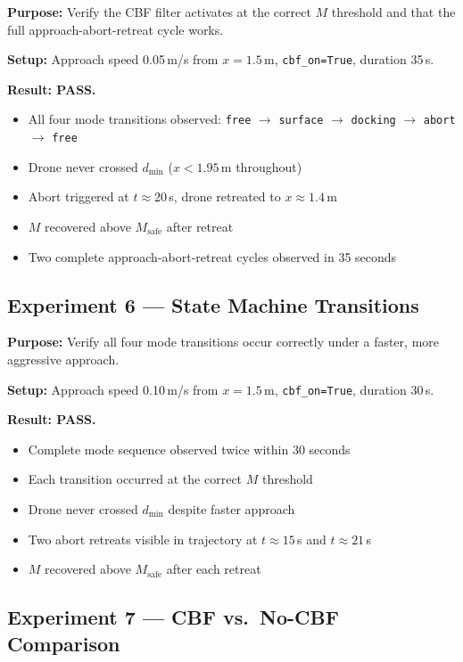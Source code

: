 \documentclass[12pt]{article}
\begin{document}
\textbf{Purpose:} Verify the CBF filter activates at the correct $M$
threshold and that the full approach-abort-retreat cycle works.

\textbf{Setup:} Approach speed 0.05\,m/s from $x = 1.5$\,m,
\texttt{cbf\_on=True}, duration 35\,s.

\textbf{Result: PASS.}
\begin{itemize}
    \item All four mode transitions observed: \texttt{free} $\to$
          \texttt{surface} $\to$ \texttt{docking} $\to$
          \texttt{abort} $\to$ \texttt{free}
    \item Drone never crossed $d_{\min}$ ($x < 1.95$\,m throughout)
    \item Abort triggered at $t \approx 20$\,s, drone retreated to
          $x \approx 1.4$\,m
    \item $M$ recovered above $M_\mathrm{safe}$ after retreat
    \item Two complete approach-abort-retreat cycles observed in
          35 seconds
\end{itemize}

\subsection{Experiment 6 --- State Machine Transitions}

\textbf{Purpose:} Verify all four mode transitions occur correctly
under a faster, more aggressive approach.

\textbf{Setup:} Approach speed 0.10\,m/s from $x = 1.5$\,m,
\texttt{cbf\_on=True}, duration 30\,s.

\textbf{Result: PASS.}
\begin{itemize}
    \item Complete mode sequence observed twice within 30 seconds
    \item Each transition occurred at the correct $M$ threshold
    \item Drone never crossed $d_{\min}$ despite faster approach
    \item Two abort retreats visible in trajectory at $t \approx
          15$\,s and $t \approx 21$\,s
    \item $M$ recovered above $M_\mathrm{safe}$ after each retreat
\end{itemize}

\subsection{Experiment 7 --- CBF vs.\ No-CBF Comparison}
\end{document}
